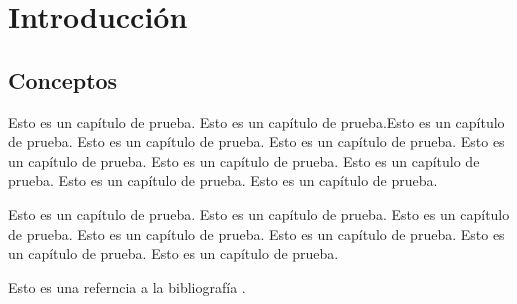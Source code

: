 \chapter{Introducción}\label{introduccion}
\section{Conceptos}\label{conceptos}

Esto es un cap\'itulo de prueba. Esto es un cap\'itulo de prueba.Esto es un cap\'itulo de prueba.
Esto es un cap\'itulo de prueba. Esto es un cap\'itulo de prueba. Esto es un cap\'itulo de prueba. 
Esto es un cap\'itulo de prueba. Esto es un cap\'itulo de prueba. Esto es un cap\'itulo de prueba. 
Esto es un cap\'itulo de prueba. 

Esto es un cap\'itulo de prueba. Esto es un cap\'itulo de prueba. Esto es un cap\'itulo de prueba. 
Esto es un cap\'itulo de prueba. Esto es un cap\'itulo de prueba. Esto es un cap\'itulo de prueba. 
Esto es un cap\'itulo de prueba. 

Esto es una referncia a la bibliograf\'ia \cite{desousa}.




